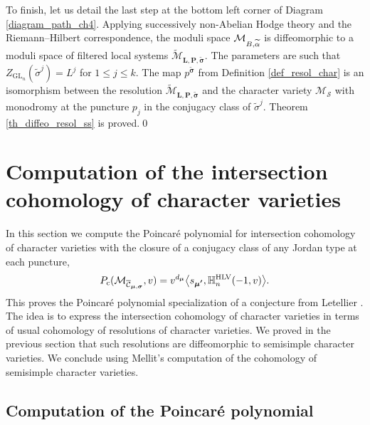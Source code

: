 \documentclass[JEP,XML,SOM,NoEqCountersInSection,Unicode,published]{cedram}
\newcommand{\NoChangel}[1]{%
\expandafter\let\csname old\string#1\endcsname=#1
\let#1=\relax
\newcommand{#1}{\mathcode`l="716C\csname old\string#1\endcsname\mathcode`l="7160 }%
}
\newcommand{\Dol}{\mathrm{Dol}}\NoChangel{\Dol}
\newcommand{\rc}{\mathrm{c}}
\newcommand{\HLV}{\textup{HLV}}
\newcommand{\blangle}{\bigl\langle}
\newcommand{\brangle}{\bigr\rangle}
\theoremstyle{definition}
\theoremstyle{plain}
\DeclareMathOperator{\GL}{GL}
\begin{document}
To finish, let us detail the last step at the bottom left corner of Diagram \eqref{diagram_path_ch4}. Applying successively non-Abelian Hodge theory and the Riemann--Hilbert correspondence, the moduli space $\mathcal{M}_{B,\widetilde{\alpha}}^{\Dol}$ is diffeomorphic to a moduli space of filtered local systems $\widetilde{\mathcal{M}}_{\boldsymbol{L},\boldsymbol{P},\boldsymbol{\widetilde{\sigma}}}$. The parameters are such that $Z_{\GL_n}(\widetilde{\sigma}^j) = L^j$ for $1\le j \le k$. The map $p^{\boldsymbol{\widetilde{\sigma}}}$ from Definition \ref{def_resol_char} is an isomorphism between the resolution $\widetilde{\mathcal{M}}_{\boldsymbol{L},\boldsymbol{P},\boldsymbol{\widetilde{\sigma}}}$ and the character variety $\mathcal{M}_{\boldsymbol{\mathcal{S}}}$ with monodromy at the puncture $p_j$ in the conjugacy class of $\widetilde{\sigma}^j$. Theorem \ref{th_diffeo_resol_ss} is proved.\qed

\section{Computation of the intersection cohomology of character varieties}\label{sect_computation_pc}
In this section we compute the Poincaré polynomial for intersection cohomology of character varieties with the closure of a conjugacy class of any Jordan type at each puncture,
\[
P_{\rc}(\mathcal{M}_{\overline{{\mathcal{C}}}_{\boldsymbol{\mu},\boldsymbol{\sigma}}},v) = v^{d_{\boldsymbol{\mu}}}\blangle s_{\boldsymbol{\mu'}}, \mathbb{H}_n^{\HLV}(-1,v)\brangle.
\]
This proves the Poincaré polynomial specialization of a conjecture from Letellier \cite{Letellier13}. The idea is to express the intersection cohomology of character varieties in terms of usual cohomology of resolutions of character varieties.
We proved in the previous section that such resolutions are diffeomorphic to semisimple character varieties. We conclude using Mellit's computation \cite{Mellit2020} of the cohomology of semisimple character varieties.

\subsection{Computation of the Poincaré polynomial}\label{sect_poincare_comput}
\end{document}
